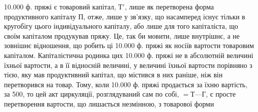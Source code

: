 \num{10.000} ф. пряжі є товаровий капітал, $Т'$, лише як перетворена форма
продуктивного капіталу $П$, отже, лише у зв’язку, що насамперед існує
тільки в кругобігу цього індивідуального капіталу, або лише для того
капіталіста, що своїм капіталом продукував пряжу. Це, так би мовити,
лише внутрішнє, а не зовнішнє відношення, що робить ці \num{10.000} ф.
пряжі як носіїв вартости товаровим капіталом. Капіталістична родинка
цих \num{10.000} ф. пряжі не в абсолютній величині їхньої вартости, а в її відносній
величині, у величині їхньої вартости порівняно з тією, яку мав
продуктивний капітал, що містився в них раніше, ніж він перетворився
на товар. Тому, коли \num{10.000} ф. пряжі продається за їхню вартість, за
500, то цей акт циркуляції, розглядуваний сам по собі, $= Т — Г$,
є просте перетворення вартости, що лишається незмінною, з товарової форми
\parbreak{}  %
